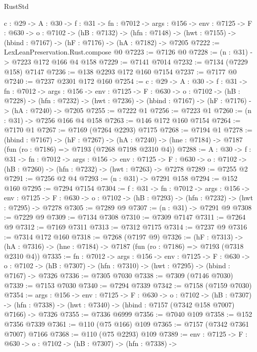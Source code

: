 \begin{lexlean}{RustStd}
\begin{coremodule}
  {c : @29} ->
  {A : @30} ->
  {f : @31} ->
  {fn : @7012} ->
  {args : @156} ->
  {env : @7125} ->
  {F : @630} ->
  {o : @7102} ->
  (hB : @7132) ->
  (hfn : @7148) -> (hwt : @7155) -> (hbind : @7167) -> (hF : @7176) -> (hA : @7182) -> @7205
@7222 := LexLeanPreservation.Rust.compose @0
@7223 := @7126 @0
@7228 := (n : @31) -> @7223 @172 @166 @4 @158
@7229 := @7141 @7014
@7232 := @7134 (@7229 @158) @7147
@7236 := @138 @2293 @172 @160 @7154
@7237 := @7177 @0
@7240 := @7237 @2301 @172 @160
@7254 := {c : @29} ->
  {A : @30} ->
  {f : @31} ->
  {fn : @7012} ->
  {args : @156} ->
  {env : @7125} ->
  {F : @630} ->
  {o : @7102} ->
  (hB : @7228) ->
  (hfn : @7232) -> (hwt : @7236) -> (hbind : @7167) -> (hF : @7176) -> (hA : @7240) -> @7205
@7255 := @7222 @1
@7256 := @7223 @1
@7260 := (n : @31) -> @7256 @166 @4 @158
@7263 := @146 @172 @160 @7154
@7264 := @7170 @1
@7267 := @7169 (@7264 @2293) @7175
@7268 := @7194 @1
@7278 := (hbind : @7167) ->
  (hF : @7267) ->
  (hA : @7240) -> (hne : @7184) -> @7187 (fun (ro : @7186) => @7193 (@7268 @7198 @2310 @4))
@7288 := {A : @30} ->
  {f : @31} ->
  {fn : @7012} ->
  {args : @156} ->
  {env : @7125} ->
  {F : @630} -> {o : @7102} -> (hB : @7260) -> (hfn : @7232) -> (hwt : @7263) -> @7278
@7289 := @7255 @2
@7291 := @7256 @2 @4
@7293 := (n : @31) -> @7291 @158
@7294 := @152 @160
@7295 := @7294 @7154
@7304 := {f : @31} ->
  {fn : @7012} ->
  {args : @156} ->
  {env : @7125} ->
  {F : @630} -> {o : @7102} -> (hB : @7293) -> (hfn : @7232) -> (hwt : @7295) -> @7278
@7305 := @7289 @9
@7307 := (n : @31) -> @7291 @9
@7308 := @7229 @9
@7309 := @7134 @7308
@7310 := @7309 @7147
@7311 := @7264 @9
@7312 := @7169 @7311
@7313 := @7312 @7175
@7314 := @7237 @9
@7316 := @7314 @172 @160
@7318 := @7268 (@7197 @9)
@7326 := (hF : @7313) ->
  (hA : @7316) -> (hne : @7184) -> @7187 (fun (ro : @7186) => @7193 (@7318 @2310 @4))
@7335 := {fn : @7012} ->
  {args : @156} ->
  {env : @7125} ->
  {F : @630} ->
  {o : @7102} -> (hB : @7307) -> (hfn : @7310) -> (hwt : @7295) -> (hbind : @7167) -> @7326
@7336 := @7305 @7030
@7338 := @7309 (@7146 @7030)
@7339 := @7153 @7030
@7340 := @7294 @7339
@7342 := @7158 (@7159 @7030)
@7354 := {args : @156} ->
  {env : @7125} ->
  {F : @630} ->
  {o : @7102} ->
  (hB : @7307) ->
  (hfn : @7338) -> (hwt : @7340) -> (hbind : @7157 (@7342 @158 @7007) @7166) -> @7326
@7355 := @7336 @6999
@7356 := @7040 @109
@7358 := @152 @7356 @7339
@7361 := @110 (@75 @166) @109
@7365 := @7157 (@7342 @7361 @7007) @7166
@7368 := @110 (@75 @2293) @109
@7389 := {env : @7125} ->
  {F : @630} ->
  {o : @7102} ->
  (hB : @7307) ->
  (hfn : @7338) ->

\end{coremodule}
\end{lexlean}
